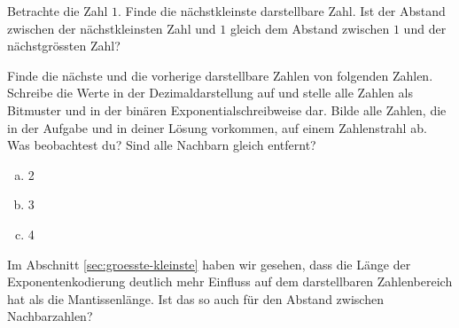 \begin{aufgabe}\label{nachbarn-vorherige}
Betrachte die Zahl \(1\). Finde die nächstkleinste darstellbare Zahl. Ist der Abstand zwischen der nächstkleinsten Zahl und \(1\) gleich dem Abstand zwischen \(1\) und der nächstgrössten Zahl?
\end{aufgabe}

\begin{aufgabe}\label{nachbarn}
Finde die nächste und die vorherige darstellbare Zahlen von folgenden Zahlen. Schreibe die Werte in der Dezimaldarstellung auf und stelle alle Zahlen als Bitmuster und in der binären Exponentialschreibweise dar. Bilde alle Zahlen, die in der Aufgabe und in deiner Lösung vorkommen, auf einem Zahlenstrahl ab. Was beobachtest du? Sind alle Nachbarn gleich entfernt?
\begin{enumerate}[(a)]
\item 2
\item 3
\item 4
\end{enumerate}
\end{aufgabe}

Im Abschnitt \ref{sec:groesste-kleinste} haben wir gesehen, dass die Länge der Exponentenkodierung deutlich mehr Einfluss auf dem darstellbaren Zahlenbereich hat als die Mantissenlänge. Ist das so auch für den Abstand zwischen Nachbarzahlen?

